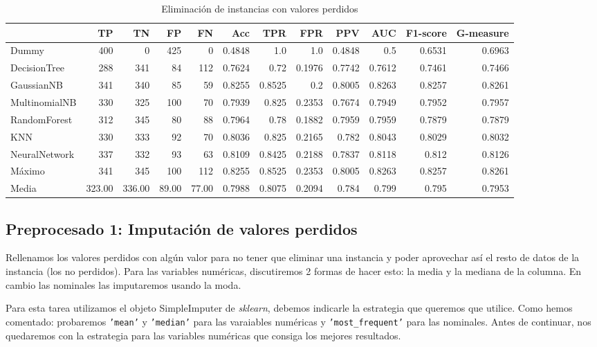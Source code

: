 \documentclass{article}
\begin{document}
\begin{table}[H]
\centering
\caption{Eliminación de instancias con valores perdidos}
\label{tab:basic}
\begin{tabular}{|lrrrrrrrrrrr|}
\hline
 & TP & TN & FP & FN & Acc & TPR & FPR & PPV & AUC & F1-score & G-measure\\ \hline
Dummy & 400 & 0 & 425 & 0 & 0.4848 & 1.0 & 1.0 & 0.4848 & 0.5 & 0.6531 & 0.6963\\
DecisionTree & 288 & 341 & 84 & 112 & 0.7624 & 0.72 & 0.1976 & 0.7742 & 0.7612 & 0.7461 & 0.7466\\
GaussianNB & 341 & 340 & 85 & 59 & 0.8255 & 0.8525 & 0.2 & 0.8005 & 0.8263 & 0.8257 & 0.8261\\
MultinomialNB & 330 & 325 & 100 & 70 & 0.7939 & 0.825 & 0.2353 & 0.7674 & 0.7949 & 0.7952 & 0.7957\\
RandomForest & 312 & 345 & 80 & 88 & 0.7964 & 0.78 & 0.1882 & 0.7959 & 0.7959 & 0.7879 & 0.7879\\
KNN & 330 & 333 & 92 & 70 & 0.8036 & 0.825 & 0.2165 & 0.782 & 0.8043 & 0.8029 & 0.8032\\
NeuralNetwork & 337 & 332 & 93 & 63 & 0.8109 & 0.8425 & 0.2188 & 0.7837 & 0.8118 & 0.812 & 0.8126\\ \hline
Máximo & 341 & 345 & 100 & 112 & 0.8255 & 0.8525 & 0.2353 & 0.8005 & 0.8263 & 0.8257 & 0.8261\\
Media & 323.00 & 336.00 & 89.00 & 77.00 & 0.7988 & 0.8075 & 0.2094 & 0.784 & 0.799 & 0.795 & 0.7953\\
\hline
\end{tabular}
\end{table}

\subsection{Preprocesado 1: Imputación de valores perdidos}

Rellenamos los valores perdidos con algún valor para no tener que
eliminar una instancia y poder aprovechar así el resto de datos de la
instancia (los no perdidos). Para las variables numéricas,
discutiremos 2 formas de hacer esto: la media y la mediana de la
columna. En cambio las nominales las imputaremos usando la moda.

Para esta tarea utilizamos el objeto SimpleImputer de
\textit{sklearn}, debemos indicarle la estrategia que queremos que
utilice. Como hemos comentado: probaremos \texttt{'mean'} y
\texttt{'median'} para las varaiables numéricas y
\texttt{'most\_frequent'} para las nominales. Antes de continuar, nos
quedaremos con la estrategia para las variables numéricas que consiga
los mejores resultados.
\end{document}
